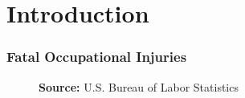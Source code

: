 

\section{Introduction}



\begin{frame}
    \frametitle{Fatal Occupational Injuries}

    \begin{figure}
        \centering
        \resizebox{0.75\linewidth}{!}{
            
        }

        {\tiny \textbf{Source:} U.S. Bureau of Labor Statistics}
    \end{figure}
    
\end{frame}

